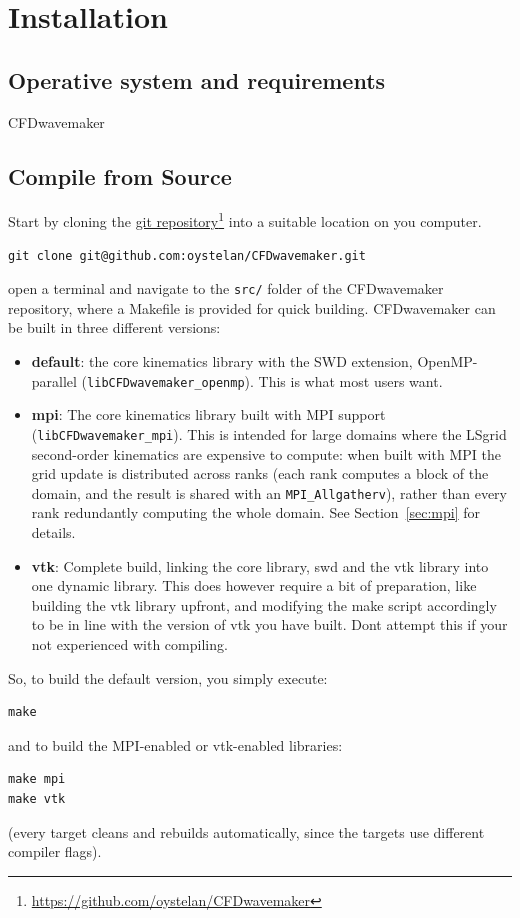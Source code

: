 \documentclass{ol-softwaremanual}
\newcommand{\doclink}[2]{\href{#1}{#2}\footnote{\url{#1}}}
\begin{document}
\section{Installation}
\subsection{Operative system and requirements}
CFDwavemaker
\subsection{Compile from Source}
Start by cloning the \doclink{https://github.com/oystelan/CFDwavemaker}{git repository} into a suitable location on you computer.
\begin{lstlisting}[numbers=none]
git clone git@github.com:oystelan/CFDwavemaker.git
\end{lstlisting}
open a terminal and navigate to the \texttt{src/} folder of the CFDwavemaker repository, where a Makefile is provided for quick building. CFDwavemaker can be built in three different versions:
\begin{itemize}
    \item \textbf{default}: the core kinematics library with the SWD extension, OpenMP-parallel (\texttt{libCFDwavemaker\_openmp}). This is what most users want.
    \item \textbf{mpi}: The core kinematics library built with MPI support (\texttt{libCFDwavemaker\_mpi}). This is intended for large domains where the LSgrid second-order kinematics are expensive to compute: when built with MPI the grid update is distributed across ranks (each rank computes a block of the domain, and the result is shared with an \texttt{MPI\_Allgatherv}), rather than every rank redundantly computing the whole domain. See Section~\ref{sec:mpi} for details.
    \item \textbf{vtk}: Complete build, linking the core library, swd and the vtk library into one dynamic library. This does however require a bit of preparation, like building the vtk library upfront, and modifying the make script accordingly to be in line with the version of vtk you have built. Dont attempt this if your not experienced with compiling.
\end{itemize}
So, to build the default version, you simply execute:
\begin{lstlisting}[numbers=none]
make
\end{lstlisting}
and to build the MPI-enabled or vtk-enabled libraries:
\begin{lstlisting}[numbers=none]
make mpi
make vtk
\end{lstlisting}
(every target cleans and rebuilds automatically, since the targets use different compiler flags).
\end{document}
